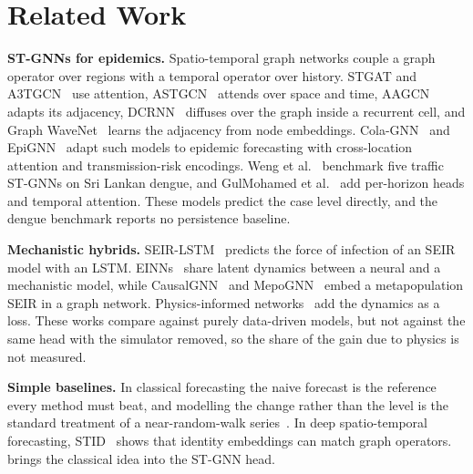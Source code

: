 \section{Related Work}
\label{sec:related}

\textbf{ST-GNNs for epidemics.} Spatio-temporal graph networks couple a graph
operator over regions with a temporal operator over history. STGAT and
A3TGCN~\cite{bai2021a3tgcn} use attention, ASTGCN~\cite{guo2019astgcn} attends over
space and time, AAGCN~\cite{shi2019aagcn} adapts its adjacency,
DCRNN~\cite{li2018dcrnn} diffuses over the graph inside a recurrent cell, and Graph
WaveNet~\cite{wu2019graphwavenet} learns the adjacency from node embeddings.
Cola-GNN~\cite{deng2020colagnn} and EpiGNN~\cite{xie2022epignn} adapt such models to
epidemic forecasting with cross-location attention and transmission-risk encodings. Weng et al.~\cite{weng2024graph} benchmark five traffic ST-GNNs
on Sri Lankan dengue, and GulMohamed et al.~\cite{gulmohamed2026denguegnn} add
per-horizon heads and temporal attention. These models predict the case level
directly, and the dengue benchmark reports no persistence baseline.

\textbf{Mechanistic hybrids.} SEIR-LSTM~\cite{liu2025seirlstm} predicts the force of
infection of an SEIR model with an LSTM. EINNs~\cite{rodriguez2023einns} share latent
dynamics between a neural and a mechanistic model, while
CausalGNN~\cite{wang2022causalgnn} and MepoGNN~\cite{cao2023mepognn} embed a
metapopulation SEIR in a graph network. Physics-informed
networks~\cite{raissi2019pinn,nguyen2024mppinn} add the dynamics as a loss. These works
compare against purely data-driven models, but not against the same head with the
simulator removed, so the share of the gain due to physics is not measured.

\textbf{Simple baselines.} In classical forecasting the naive forecast is the reference
every method must beat, and modelling the change rather than the level is the standard
treatment of a near-random-walk series~\cite{hyndman2021forecasting}. In deep
spatio-temporal forecasting, STID~\cite{shao2022stid} shows that identity embeddings
can match graph operators. \model{} brings the classical idea into the ST-GNN head.
